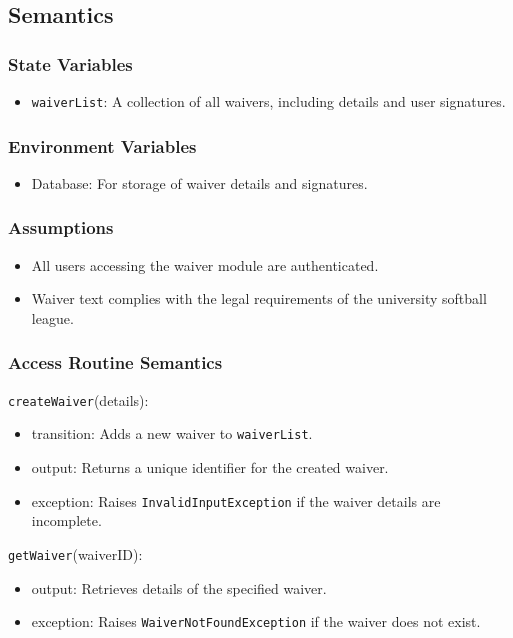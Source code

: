 \documentclass[12pt, titlepage]{article}
\begin{document}
\subsection{Semantics}

\subsubsection{State Variables}

\begin{itemize}
    \item \texttt{waiverList}: A collection of all waivers, including details and user signatures.
\end{itemize}

\subsubsection{Environment Variables}
\begin{itemize}
    \item Database: For storage of waiver details and signatures.
\end{itemize}

\subsubsection{Assumptions}
\begin{itemize}
    \item All users accessing the waiver module are authenticated.
    \item Waiver text complies with the legal requirements of the university softball league.
\end{itemize}

\subsubsection{Access Routine Semantics}

\noindent \texttt{createWaiver}(details):  
\begin{itemize}
    \item transition: Adds a new waiver to \texttt{waiverList}.
    \item output: Returns a unique identifier for the created waiver.
    \item exception: Raises \texttt{InvalidInputException} if the waiver details are incomplete.
\end{itemize}

\noindent \texttt{getWaiver}(waiverID):  
\begin{itemize}
    \item output: Retrieves details of the specified waiver.
    \item exception: Raises \texttt{WaiverNotFoundException} if the waiver does not exist.
\end{itemize}
\end{document}
